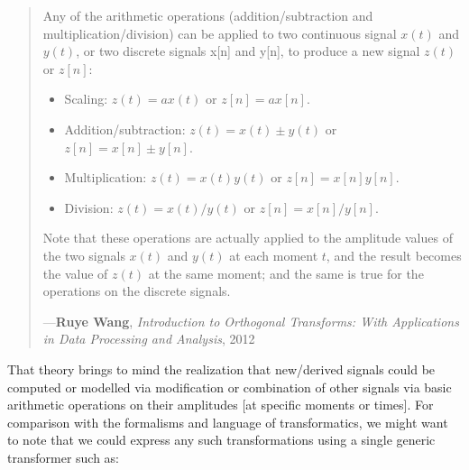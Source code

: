 \documentclass[a4paper, 18pt]{book} %
\begin{document}
\begin{appendices}
\begin{minipage}{1\textwidth}
\begin{quotation}
{Any of the arithmetic operations (addition/subtraction and multiplication/division) can be applied to two continuous signal $x(t)$ and $y(t)$, or two discrete signals x[n] and y[n], to produce a new signal $z(t)$ or $z[n]$:\\

\begin{itemize}
\item Scaling: $z(t) = ax(t)$ or $z[n] = ax[n]$.
\item Addition/subtraction: $z(t) = x(t) ± y(t)$ or $z[n] = x[n] ± y[n]$.
\item Multiplication: $z(t) = x(t)y(t)$ or $z[n] = x[n]y[n]$.
\item Division: $z(t) = x(t)/y(t)$ or $z[n] = x[n]/y[n]$.
\end{itemize}

\vspace{1em}

Note that these operations are actually applied to the amplitude values of the two signals $x(t)$ and $y(t)$ at each moment $t$, and the result becomes the value of $z(t)$ at the same moment; and the same is true for the operations on the discrete signals.

}
\hspace*{\fill} ---\textbf{Ruye Wang}, \textit{Introduction to Orthogonal Transforms: With Applications in Data Processing and Analysis}, 2012\cite{Wang2012}
\end{quotation}
\vspace{1em}
\end{minipage}


That theory brings to mind the realization that new/derived signals could be computed or modelled via modification or combination of other signals via basic arithmetic operations on their amplitudes [at specific moments or times]. For comparison with the formalisms and language of transformatics, we might want to note that we could express any such transformations using a single generic transformer such as:\\



\end{appendices}
\end{document}
